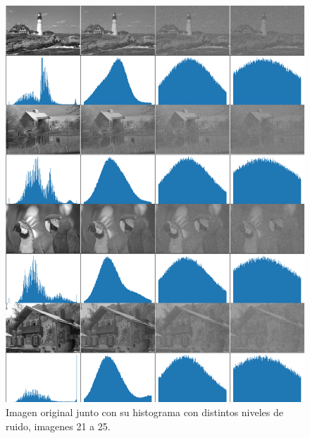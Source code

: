\begin{figure}
    \centering
    \includegraphics[width=\textwidth]{figuras/img_hist_noise_5.png}
    \caption{Imagen original junto con su histograma con distintos niveles de ruido, imagenes 21 a 25.}
\end{figure}

